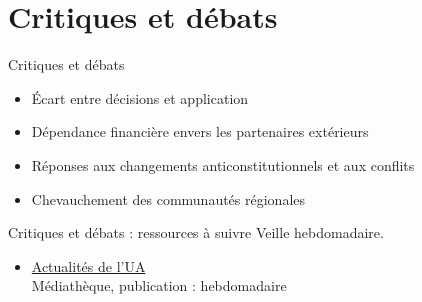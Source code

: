 \documentclass[aspectratio=169,11pt]{beamer}
\begin{document}
\section{Critiques et débats}
\begin{frame}{Critiques et débats}
\begin{itemize}
\item Écart entre décisions et application
\item Dépendance financière envers les partenaires extérieurs
\item Réponses aux changements anticonstitutionnels et aux conflits
\item Chevauchement des communautés régionales
\end{itemize}
\end{frame}

\begin{frame}{Critiques et débats : ressources à suivre}
\small
Veille hebdomadaire.
\begin{itemize}
\item \href{https://au.int/en/pressreleases}{Actualités de l'UA}\\{\footnotesize Médiathèque, publication : hebdomadaire}
\end{itemize}
\end{frame}
\end{document}
